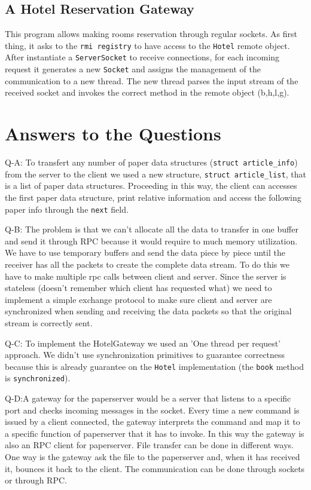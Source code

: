 \subsection{A Hotel Reservation Gateway}
This program allows making rooms reservation through regular sockets. As first thing, it asks to the \texttt{rmi registry} to have access to the \texttt{Hotel} remote object. After instantiate a  \texttt{ServerSocket} to receive connections, for each incoming request it generates a new \texttt{Socket} and assigns the management of the communication to a new thread. The new thread parses the input stream of the received socket and invokes the correct method in the remote object (b,h,l,g).

\section{Answers to the Questions}
Q-A: To transfert any number of paper data structures (\texttt{struct article\_info}) from the server to the client we used a new structure, \texttt{struct article\_list}, that is a list of paper data structures. Proceeding in this way, the client can accesses the first paper data structure, print relative information and access the following paper info through the \texttt{next} field.

Q-B: The problem is that we can't allocate all the data to transfer in one buffer and send it through RPC because it would require to much memory utilization. We have to use temporary buffers and send the data piece by piece until the receiver has all the packets to create the complete data stream. To do this we have to make multiple rpc calls between client and server. Since the server is stateless (doesn't remember which client has requested what) we need to implement a simple exchange protocol to make sure client and server are synchronized when sending and receiving the data packets so that the original stream is correctly sent.

Q-C: To implement the HotelGateway we used an 'One thread per request' approach. We didn't use synchronization primitives to guarantee correctness because this is already guarantee on the \texttt{Hotel} implementation (the \texttt{book} method is \texttt{synchronized}).

Q-D:A gateway for the paperserver would be a server that listens to a specific port and checks incoming messages in the socket. Every time a new command is issued by a client connected, the gateway interprets the command and map it to a specific function of paperserver that it has to invoke. In this way the gateway is also an RPC client for paperserver. File transfer can be done in different ways. One way is the gateway ask the file to the paperserver and, when it has received it, bounces it back to the client. The communication can be done through sockets or through RPC.


